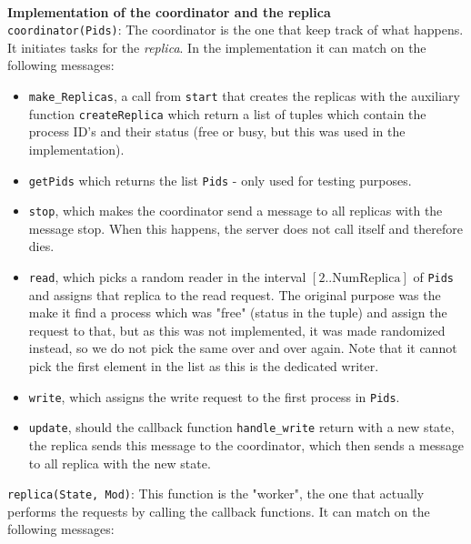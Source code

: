 \documentclass[a4paper]{article}
\begin{document}
\\
\textbf{Implementation of the coordinator and the replica} \\
\texttt{coordinator(Pids)}: The coordinator is the one that keep track of what happens. It initiates tasks for the \textit{replica}. In the implementation it can match on the following messages:
\begin{itemize}
\item \texttt{make\_Replicas}, a call from \texttt{start} that creates the replicas with the auxiliary function \texttt{createReplica} which return a list of tuples which contain the process ID's and their status (free or busy, but this was used in the implementation).
\item \texttt{getPids} which returns the list \texttt{Pids} - only used for testing purposes.
\item \texttt{stop}, which makes the coordinator send a message to all replicas with the message stop. When this happens, the server does not call itself and therefore dies.
\item \texttt{read}, which picks a random reader in the interval $[2..\text{NumReplica}]$ of \texttt{Pids} and assigns that replica to the read request. The original purpose was the make it find a process which was "free" (status in the tuple) and assign the request to that, but as this was not implemented, it was made randomized instead, so we do not pick the same over and over again. Note that it cannot pick the first element in the list as this is the dedicated writer.
\item \texttt{write}, which assigns the write request to the first process in \texttt{Pids}.
\item \texttt{update}, should the callback function \texttt{handle\_write} return with a new state, the replica sends this message to the coordinator, which then sends a message to all replica with the new state.
\end{itemize}
\texttt{replica(State, Mod)}: This function is the "worker", the one that actually performs the requests by calling the callback functions. It can match on the following messages:
\end{document}
